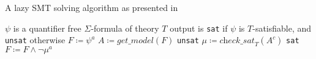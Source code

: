 \begin{algorithm}
    \caption{A lazy SMT solving algorithm as presented in \cite{Barrett-Tinelli-SMT}}
    \begin{algorithmic}
    \label{algorithm:preliminaries:smtsolving:lazy_algo}
    \REQUIRE $\psi$ is a quantifier free $\Sigma$-formula of theory $T$
    \ENSURE output is \texttt{sat} if $\psi$ is $T$-satisfiable, and \texttt{unsat} otherwise
    \STATE $F \coloneqq \psi^a$
    \LOOP
        \STATE $A \coloneqq \textit{get\_model}\left(F\right)$
            \RETURN \texttt{unsat}
        \ELSE
            \STATE $\mu \coloneqq \textit{check\_sat}_T\left(A^c\right)$
                \RETURN \texttt{sat}
            \ELSE
                \STATE $F \coloneqq F \land \neg \mu^a$
            \ENDIF
        \ENDIF
    \ENDLOOP
    \end{algorithmic}
\end{algorithm}